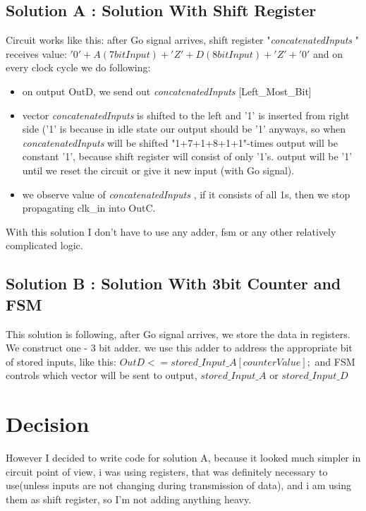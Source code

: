 \documentclass{article}
\newcommand{\concatenatedInputs}{\textit{concatenatedInputs }}
\begin{document}
\subsection{Solution A : Solution With Shift Register}
Circuit works like this: after Go signal arrives, shift register "\concatenatedInputs" receives value: 
\newline $ '0' + A(7bitInput) + 'Z' + D(8bitInput) + 'Z' + '0' $ \newline
and on every clock cycle we do following: \newline
\begin{itemize}
\item on output OutD, we send out \concatenatedInputs[Left\_Most\_Bit]
\item vector \concatenatedInputs is shifted to the left and '1' is inserted from right side ('1' is because in idle state our output should be '1' anyways, so when \concatenatedInputs will be shifted "1+7+1+8+1+1"-times output will be constant '1', because shift register will consist of only '1's. output will be '1' until we reset the circuit or give it new input (with Go signal).
\item we observe value of \concatenatedInputs, if it consists of all 1s, then we stop propagating clk\_in into OutC.
\end{itemize}
With this solution I don't have to use any adder, fsm or any other relatively complicated logic. 


\subsection{Solution B : Solution With 3bit Counter and FSM}
This solution is following, after Go signal arrives, we store the data in registers. We construct one - 3 bit adder. we use this adder to address the appropriate bit of stored inputs, like this: \newline
$ OutD <= stored\_Input\_A [counterValue]; $
and FSM controls which vector will be sent to output, $stored\_Input\_A$ or $stored\_Input\_D$


\section{Decision}
However I decided to write code for solution A, because it looked much simpler in circuit point of view, i was using registers, that was definitely necessary to use(unless inputs are not changing during transmission of data), and i am using them as shift register, so I'm not adding anything heavy.
\end{document}
